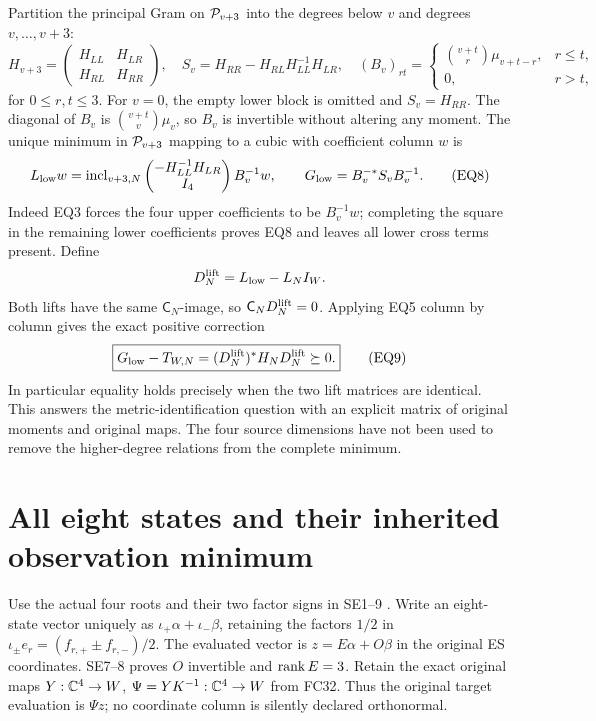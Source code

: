 \documentclass[11pt]{article}
\begin{document}
Partition the principal Gram on $\mathcal P_{v+3}$ into the degrees below
$v$ and degrees $v,\ldots,v+3$:
\[
 H_{v+3}=\begin{pmatrix}H_{LL}&H_{LR}\\H_{RL}&H_{RR}\end{pmatrix},
 \quad S_v=H_{RR}-H_{RL}H_{LL}^{-1}H_{LR},
 \quad (B_v)_{rt}=\begin{cases}\binom{v+t}{r}\mu_{v+t-r},&r\le t,\\
 0,&r>t,\end{cases}                                                \tag{EQ7}
\]
for $0\le r,t\le3$. For $v=0$, the empty lower block is omitted
and $S_v=H_{RR}$. The diagonal of $B_v$ is
$\binom{v+t}{v}\mu_v$, so $B_v$ is invertible without altering
any moment. The unique minimum in $\mathcal P_{v+3}$ mapping to a cubic
with coefficient column $w$ is
\[
 L_{\rm low}w=\operatorname{incl}_{v+3,N}
 \begin{pmatrix}-H_{LL}^{-1}H_{LR}\\I_4\end{pmatrix}B_v^{-1}w,
 \qquad G_{\rm low}=B_v^{-*}S_vB_v^{-1}.                            \tag{EQ8}
\]
Indeed EQ3 forces the four upper coefficients to be $B_v^{-1}w$;
completing the square in the remaining lower coefficients proves
EQ8 and leaves all lower cross terms present. Define
\[
 D_N^{\rm lift}=L_{\rm low}-L_NI_W.
\]
Both lifts have the same $\mathsf C_N$-image, so
$\mathsf C_ND_N^{\rm lift}=0$. Applying EQ5 column by column gives
the exact positive correction
\[
 \boxed{G_{\rm low}-T_{W,N}
       =(D_N^{\rm lift})^*H_ND_N^{\rm lift}\succeq0.}                \tag{EQ9}
\]
In particular equality holds precisely when the two lift matrices
are identical. This answers the metric-identification question with
an explicit matrix of original moments and original maps. The four
source dimensions have not been used to remove the higher-degree
relations from the complete minimum.

\section{All eight states and their inherited observation minimum}
Use the actual four roots and their two factor signs in SE1--9
\cite{eightmin:FC}. Write an eight-state vector uniquely as
$\iota_+\alpha+\iota_-\beta$, retaining the factors $1/2$ in
$\iota_\pm e_r=(f_{r,+}\pm f_{r,-})/2$. The evaluated vector is
$z=E\alpha+O\beta$ in the original ES coordinates. SE7--8 proves
$O$ invertible and $\operatorname{rank} E=3$. Retain the exact original maps
$Y:\mathbb C^4\to W$, $\Psi=YK^{-1}:\mathbb C^4\to W$ from FC32.
Thus the original target evaluation is $\Psi z$; no coordinate
column is silently declared orthonormal.
\end{document}
